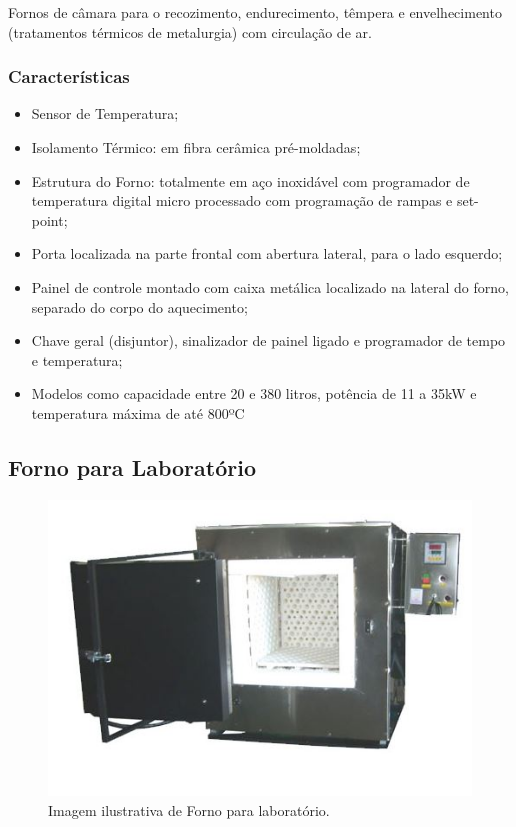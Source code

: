 Fornos de câmara para o recozimento, endurecimento, têmpera e envelhecimento (tratamentos térmicos de metalurgia) com circulação de ar.

\subsubsection{Características}

\begin{itemize}
	\item Sensor de Temperatura;
	\item Isolamento Térmico: em fibra cerâmica pré-moldadas;
	\item Estrutura do Forno: totalmente em aço inoxidável com programador de temperatura digital micro processado com programação de rampas e set-point;
	\item Porta localizada na parte frontal com abertura lateral, para o lado esquerdo;
	\item Painel de controle montado com caixa metálica localizado na lateral do forno, separado do corpo do aquecimento;
	\item Chave geral (disjuntor), sinalizador de painel ligado e programador de tempo e temperatura;
	\item Modelos como capacidade entre 20 e 380 litros, potência de 11 a 35kW e temperatura máxima de até 800ºC
	
\end{itemize}

\subsection{Forno para Laboratório}

\begin{figure}[!h]
	\centering
	\label{forno_laboratorio}
	\includegraphics[keepaspectratio=true,scale=0.8]{figuras/forno_laboratorio.JPG}
	\caption{Imagem ilustrativa de Forno para laboratório.}
\end{figure}

